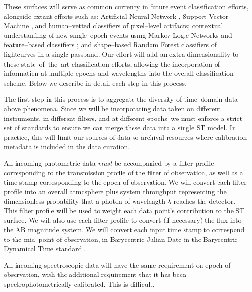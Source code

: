 These surfaces will serve as common currency in future event classification
efforts, alongside extant efforts such as: Artificial Neural Network
\citep{2008AN....329..263D}, Support Vector Machine \citep{2007ApJ...665.1246B},
and human--vetted \citep{2011arXiv1106.5491B} classifiers of pixel--level
artifacts; contextual understanding of new single--epoch events using Markov
Logic Networks \citep{2011arXiv1110.4655D} and feature--based classifiers
\citep{2011arXiv1106.5491B}; and shape--based Random Forest
\citep{2011ApJ...733...10R} classifiers of lightcurves in a single passband. Our
effort will add an extra dimensionality to these state--of--the--art
classification efforts, allowing the incorporation of information at multiple
epochs and wavelengths into the overall classification scheme.  Below we
describe in detail each step in this process.


 \smallskip

The first step in this process is to aggregate the diversity of time--domain
data above phenomena.  Since we will be incorporating data taken on different
instruments, in different filters, and at different epochs, we must enforce a
strict set of standards to ensure we can merge these data into a single ST
model. In practice, this will limit our sources of data to archival resources
where calibration metadata is included in the data curation.

All incoming photometric data {\it must} be accompanied by a filter profile
corresponding to the transmission profile of the filter of observation, as well
as a time stamp corresponding to the epoch of observation.  We will convert each
filter profile into an overall atmosphere plus system throughput representing
the dimensionless probability that a photon of wavelength $\lambda$ reaches the
detector.  This filter profile will be used to weight each data point's
contribution to the ST surface.  We will also use each filter profile to convert
(if necessary) the flux into the AB magnitude system.  We will convert each
input time stamp to correspond to the mid--point of observation, in Barycentric
Julian Date in the Barycentric Dynamical Time standard
\citep{2010PASP..122..935E}.

All incoming spectroscopic data will have the same requirement on epoch of
observation, with the additional requirement that it has been
spectrophotometrically calibrated.  This is difficult.

